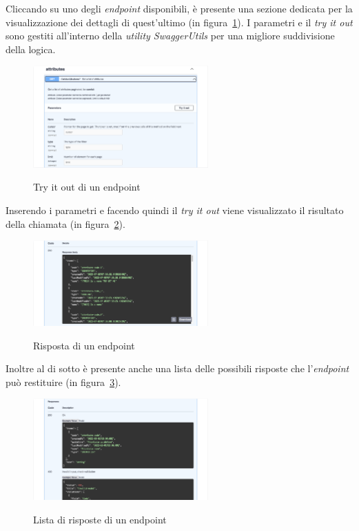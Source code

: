 Cliccando su uno degli \textit{endpoint} disponibili, è presente una sezione dedicata per la visualizzazione dei dettagli di quest'ultimo (in figura~\ref{fig:try-it-out}).
I parametri e il \textit{try it out} sono gestiti all'interno della \textit{utility SwaggerUtils} per una migliore suddivisione della logica.

\begin{figure}[ht]
  \centering
  \includegraphics[width=0.6\textwidth, alt={Sezione try it out di un endpoint}]{images/frontend/TryItOut.jpg}
  \caption{Try it out di un endpoint}\label{fig:try-it-out}
\end{figure}

Inserendo i parametri e facendo quindi il \textit{try it out} viene visualizzato il risultato della chiamata (in figura~\ref{fig:risposta-endpoint}).

\begin{figure}[ht]
  \centering
  \includegraphics[width=0.6\textwidth, alt={Sezione per la visualizzazione della risposta di un endpoint}]{images/frontend/TryItOut3.jpg}
  \caption{Risposta di un endpoint}\label{fig:risposta-endpoint}
\end{figure}

Inoltre al di sotto è presente anche una lista delle possibili risposte che l'\textit{endpoint} può restituire (in figura~\ref{fig:response-list}).

\begin{figure}[ht]
  \centering
  \includegraphics[width=0.6\textwidth, alt={Sezione per la visualizzazione delle possibili risposte di un endpoint}]{images/frontend/TryItOut4.jpg}
  \caption{Lista di risposte di un endpoint}\label{fig:response-list}
\end{figure}


